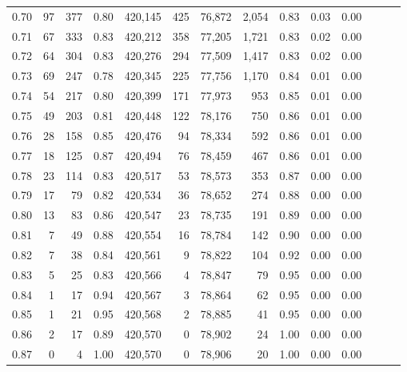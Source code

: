 \begin{tabular}{rrrrrrrrrrrrrr}
0.70 &      97 &    377 &  0.80 &  420,145 &      425 &  76,872 &   2,054 &  0.83 &  0.03 &      0.00 \\
0.71 &      67 &    333 &  0.83 &  420,212 &      358 &  77,205 &   1,721 &  0.83 &  0.02 &      0.00 \\
0.72 &      64 &    304 &  0.83 &  420,276 &      294 &  77,509 &   1,417 &  0.83 &  0.02 &      0.00 \\
0.73 &      69 &    247 &  0.78 &  420,345 &      225 &  77,756 &   1,170 &  0.84 &  0.01 &      0.00 \\
0.74 &      54 &    217 &  0.80 &  420,399 &      171 &  77,973 &     953 &  0.85 &  0.01 &      0.00 \\
0.75 &      49 &    203 &  0.81 &  420,448 &      122 &  78,176 &     750 &  0.86 &  0.01 &      0.00 \\
0.76 &      28 &    158 &  0.85 &  420,476 &       94 &  78,334 &     592 &  0.86 &  0.01 &      0.00 \\
0.77 &      18 &    125 &  0.87 &  420,494 &       76 &  78,459 &     467 &  0.86 &  0.01 &      0.00 \\
0.78 &      23 &    114 &  0.83 &  420,517 &       53 &  78,573 &     353 &  0.87 &  0.00 &      0.00 \\
0.79 &      17 &     79 &  0.82 &  420,534 &       36 &  78,652 &     274 &  0.88 &  0.00 &      0.00 \\
0.80 &      13 &     83 &  0.86 &  420,547 &       23 &  78,735 &     191 &  0.89 &  0.00 &      0.00 \\
0.81 &       7 &     49 &  0.88 &  420,554 &       16 &  78,784 &     142 &  0.90 &  0.00 &      0.00 \\
0.82 &       7 &     38 &  0.84 &  420,561 &        9 &  78,822 &     104 &  0.92 &  0.00 &      0.00 \\
0.83 &       5 &     25 &  0.83 &  420,566 &        4 &  78,847 &      79 &  0.95 &  0.00 &      0.00 \\
0.84 &       1 &     17 &  0.94 &  420,567 &        3 &  78,864 &      62 &  0.95 &  0.00 &      0.00 \\
0.85 &       1 &     21 &  0.95 &  420,568 &        2 &  78,885 &      41 &  0.95 &  0.00 &      0.00 \\
0.86 &       2 &     17 &  0.89 &  420,570 &        0 &  78,902 &      24 &  1.00 &  0.00 &      0.00 \\
0.87 &       0 &      4 &  1.00 &  420,570 &        0 &  78,906 &      20 &  1.00 &  0.00 &      0.00 \\

\end{tabular}

